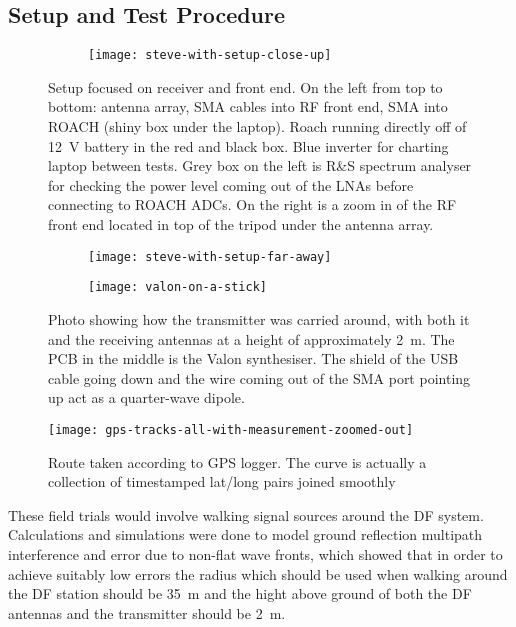 \subsection{Setup and Test Procedure}

\begin{figure}
  \centering
  \begin{subfigure}{0.8\textwidth}
    \texttt{[image: steve-with-setup-close-up]}
  \end{subfigure}
  \caption{Setup focused on receiver and front end. On the left from top to bottom: antenna array, SMA cables into RF front end, SMA into ROACH (shiny box under the laptop). Roach running directly off of \SI{12}{\volt} battery in the red and black box. Blue inverter for charting laptop between tests. Grey box on the left is R\&S spectrum analyser for checking the power level coming out of the LNAs before connecting to ROACH ADCs.  On the right is a zoom in of the RF front end located in top of the tripod under the antenna array.}
  \label{fig:field-trials:setup-closeup}
\end{figure}

\begin{figure}
  \centering
  \begin{subfigure}[b]{0.70\textwidth}
    \centering
    \texttt{[image: steve-with-setup-far-away]}
  \end{subfigure}
  \begin{subfigure}[b]{0.24\textwidth}
    \centering
    \texttt{[image: valon-on-a-stick]}
  \end{subfigure}
  \caption{Photo showing how the transmitter was carried around, with both it and the receiving antennas at a height of approximately \SI{2}{\meter}. The PCB in the middle is the Valon synthesiser. The shield of the USB cable going down and the wire coming out of the SMA port pointing up act as a quarter-wave dipole.}
  \label{fig:field-trials-transmitter-on-stick}
\end{figure}

\begin{figure}
  \centering
  \texttt{[image: gps-tracks-all-with-measurement-zoomed-out]}
  \caption{Route taken according to GPS logger. The curve is actually a collection of timestamped lat/long pairs joined smoothly}
  \label{fig:field-trails:gps-tracks-all}
\end{figure}

These field trials would involve walking signal sources around the DF system. Calculations and simulations were done to model ground reflection multipath interference and error due to non-flat wave fronts, which showed that in order to achieve suitably low errors the radius which should be used when walking around the DF station should be \SI{35}{\metre} and the hight above ground of both the DF antennas and the transmitter should be \SI{2}{\meter}. 

